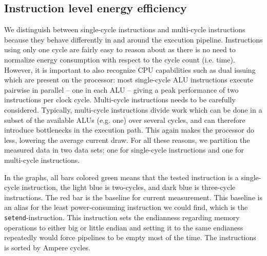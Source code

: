 
\subsection{Instruction level energy efficiency}

We distinguish between single-cycle instructions and multi-cycle instructions
because they behave differently in and around the execution pipeline.
Instructions using only one cycle are fairly easy to reason about as there is no
need to normalize energy consumption with respect to the cycle count (i.e.
time). However, it is important to also recognize CPU capabilities such as dual
issuing which are present on the processor: most single-cycle ALU instructions
execute pairwise in parallel -- one in each ALU -- giving a peak performance of
two instructions per clock cycle. Multi-cycle instructions needs to be carefully
considered. Typically, multi-cycle instructions divide work which can be done in
a subset of the available ALUs (e.g. one) over several cycles, and can therefore
introduce bottlenecks in the execution path. This again makes the processor do
less, lowering the average current draw. For all these reasons, we partition the
measured data in two data sets; one for single-cycle instructions and one for
multi-cycle instructions.

In the graphs, all bars colored green means that the tested instruction is a
single-cycle instruction, the light blue is two-cycles, and dark blue is
three-cycle instructions. The red bar is the baseline for current measurement.
This baseline is an alias for the least power-consuming instruction we could
find, which is the \texttt{setend}-instruction. This instruction sets the
endianness regarding memory operations to either big or little endian
\cite{armcompilerref} and setting it to the same endianess repeatedly would
force pipelines to be empty most of the time. The instructions is sorted by
Ampere cycles.

